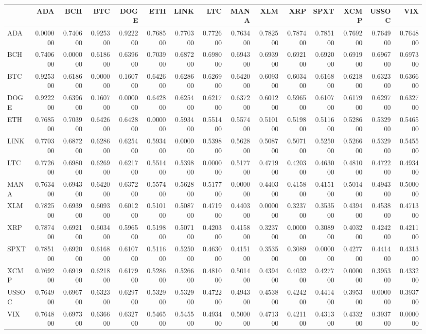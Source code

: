 \begin{tabular}{lrrrrrrrrrrrrrr}
\toprule
 & ADA & BCH & BTC & DOGE & ETH & LINK & LTC & MANA & XLM & XRP & SPXT & XCMP & USSOC & VIX \\
\midrule
ADA & 0.000000 & 0.740600 & 0.925300 & 0.922200 & 0.768500 & 0.770300 & 0.772600 & 0.763400 & 0.782500 & 0.787400 & 0.785100 & 0.769200 & 0.764900 & 0.764800 \\
BCH & 0.740600 & 0.000000 & 0.618600 & 0.639600 & 0.703900 & 0.687200 & 0.698000 & 0.694300 & 0.693900 & 0.692100 & 0.692000 & 0.691900 & 0.696700 & 0.697300 \\
BTC & 0.925300 & 0.618600 & 0.000000 & 0.160700 & 0.642600 & 0.628600 & 0.626900 & 0.642000 & 0.609300 & 0.603400 & 0.616800 & 0.621800 & 0.632300 & 0.636600 \\
DOGE & 0.922200 & 0.639600 & 0.160700 & 0.000000 & 0.642800 & 0.625400 & 0.621700 & 0.637200 & 0.601200 & 0.596500 & 0.610700 & 0.617900 & 0.629700 & 0.632700 \\
ETH & 0.768500 & 0.703900 & 0.642600 & 0.642800 & 0.000000 & 0.593400 & 0.551400 & 0.557400 & 0.510100 & 0.519800 & 0.511600 & 0.528600 & 0.532900 & 0.546500 \\
LINK & 0.770300 & 0.687200 & 0.628600 & 0.625400 & 0.593400 & 0.000000 & 0.539800 & 0.562800 & 0.508700 & 0.507100 & 0.525000 & 0.526600 & 0.532900 & 0.545500 \\
LTC & 0.772600 & 0.698000 & 0.626900 & 0.621700 & 0.551400 & 0.539800 & 0.000000 & 0.517700 & 0.471900 & 0.420300 & 0.463000 & 0.481000 & 0.472200 & 0.493400 \\
MANA & 0.763400 & 0.694300 & 0.642000 & 0.637200 & 0.557400 & 0.562800 & 0.517700 & 0.000000 & 0.440300 & 0.415800 & 0.415100 & 0.501400 & 0.494300 & 0.500000 \\
XLM & 0.782500 & 0.693900 & 0.609300 & 0.601200 & 0.510100 & 0.508700 & 0.471900 & 0.440300 & 0.000000 & 0.323700 & 0.353500 & 0.439400 & 0.453800 & 0.471300 \\
XRP & 0.787400 & 0.692100 & 0.603400 & 0.596500 & 0.519800 & 0.507100 & 0.420300 & 0.415800 & 0.323700 & 0.000000 & 0.308900 & 0.403200 & 0.424200 & 0.421100 \\
SPXT & 0.785100 & 0.692000 & 0.616800 & 0.610700 & 0.511600 & 0.525000 & 0.463000 & 0.415100 & 0.353500 & 0.308900 & 0.000000 & 0.427700 & 0.441400 & 0.431300 \\
XCMP & 0.769200 & 0.691900 & 0.621800 & 0.617900 & 0.528600 & 0.526600 & 0.481000 & 0.501400 & 0.439400 & 0.403200 & 0.427700 & 0.000000 & 0.395300 & 0.433200 \\
USSOC & 0.764900 & 0.696700 & 0.632300 & 0.629700 & 0.532900 & 0.532900 & 0.472200 & 0.494300 & 0.453800 & 0.424200 & 0.441400 & 0.395300 & 0.000000 & 0.393700 \\
VIX & 0.764800 & 0.697300 & 0.636600 & 0.632700 & 0.546500 & 0.545500 & 0.493400 & 0.500000 & 0.471300 & 0.421100 & 0.431300 & 0.433200 & 0.393700 & 0.000000 \\
\bottomrule
\end{tabular}
